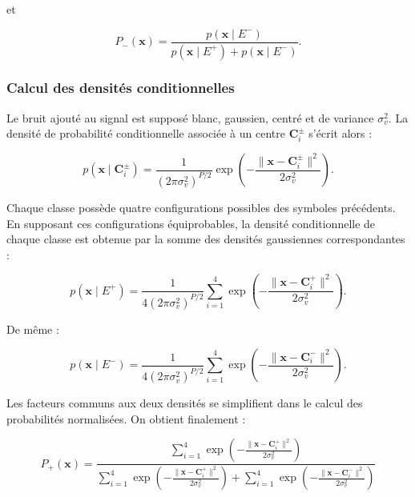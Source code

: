 et

\begin{equation}
P_-(\mathbf{x})=
\frac{p(\mathbf{x}\mid E^-)}
{p(\mathbf{x}\mid E^+)+p(\mathbf{x}\mid E^-)}.
\end{equation}

\subsubsection{Calcul des densités conditionnelles}

Le bruit ajouté au signal est supposé blanc, gaussien,
centré et de variance $\sigma_v^2$. La densité de probabilité
conditionnelle associée à un centre $\mathbf{C}_i^\pm$
s'écrit alors :

\begin{equation}
p(\mathbf{x}\mid\mathbf{C}_i^\pm)=
\frac{1}{(2\pi\sigma_v^2)^{P/2}}
\exp\left(
-\frac{\|\mathbf{x}-\mathbf{C}_i^\pm\|^2}
{2\sigma_v^2}
\right).
\end{equation}

Chaque classe possède quatre configurations possibles
des symboles précédents. En supposant ces configurations
équiprobables, la densité conditionnelle de chaque classe
est obtenue par la somme des densités gaussiennes
correspondantes :

\begin{equation}
p(\mathbf{x}\mid E^+)=
\frac{1}{4(2\pi\sigma_v^2)^{P/2}}
\sum_{i=1}^{4}
\exp\left(
-\frac{\|\mathbf{x}-\mathbf{C}_i^+\|^2}
{2\sigma_v^2}
\right).
\end{equation}

De même :

\begin{equation}
p(\mathbf{x}\mid E^-)=
\frac{1}{4(2\pi\sigma_v^2)^{P/2}}
\sum_{i=1}^{4}
\exp\left(
-\frac{\|\mathbf{x}-\mathbf{C}_i^-\|^2}
{2\sigma_v^2}
\right).
\end{equation}

Les facteurs communs aux deux densités se simplifient
dans le calcul des probabilités normalisées. On obtient
finalement :

\begin{equation}
\boxed{
P_+(\mathbf{x})=
\frac{
\displaystyle\sum_{i=1}^{4}
\exp\left(
-\frac{\|\mathbf{x}-\mathbf{C}_i^+\|^2}
{2\sigma_v^2}
\right)
}{
\displaystyle
\sum_{i=1}^{4}
\exp\left(
-\frac{\|\mathbf{x}-\mathbf{C}_i^+\|^2}
{2\sigma_v^2}
\right)
+
\sum_{i=1}^{4}
\exp\left(
-\frac{\|\mathbf{x}-\mathbf{C}_i^-\|^2}
{2\sigma_v^2}
\right)
}
}
\end{equation}


